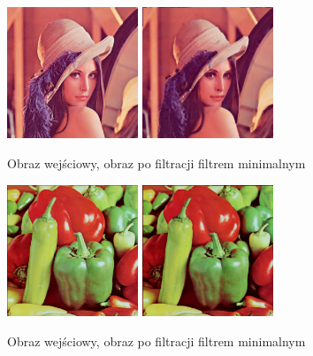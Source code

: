 \documentclass[final,a4paper,openany,12pt]{mwbk}
\begin{document}
\begin{figure}[H]
	\begin{center}
		\includegraphics[width=0.35\textwidth]{lena_color}
		\includegraphics[width=0.35\textwidth]{lena_color_min_result}
	\end{center}
	\caption{Obraz wejściowy, obraz po filtracji filtrem minimalnym}
\end{figure}

\begin{figure}[H]
	\begin{center}
		\includegraphics[width=0.35\textwidth]{peppers_color}
		\includegraphics[width=0.35\textwidth]{peppers_color_min_result}
	\end{center}
	\caption{Obraz wejściowy, obraz po filtracji filtrem minimalnym}
\end{figure}
\end{document}

